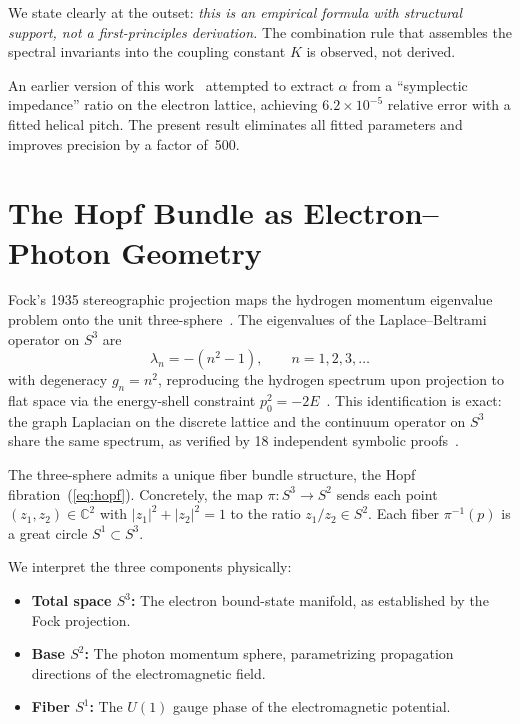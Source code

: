 \documentclass[aps,prl,twocolumn,superscriptaddress]{revtex4-2}
\begin{document}
We state clearly at the outset: \textit{this is an empirical formula
with structural support, not a first-principles derivation.} The
combination rule that assembles the spectral invariants into the
coupling constant $K$ is observed, not derived.

An earlier version of this work~\cite{paper2_old} attempted to extract
$\alpha$ from a ``symplectic impedance'' ratio on the electron
lattice, achieving $6.2 \times 10^{-5}$ relative error with a fitted
helical pitch. The present result eliminates all fitted parameters and
improves precision by a factor of~500.


\section{The Hopf Bundle as Electron--Photon Geometry}

Fock's 1935 stereographic projection maps the hydrogen momentum
eigenvalue problem onto the unit three-sphere~\cite{fock1935}. The
eigenvalues of the Laplace--Beltrami operator on $S^3$ are
\begin{equation}\label{eq:s3eig}
  \lambda_n = -(n^2 - 1), \qquad n = 1, 2, 3, \ldots
\end{equation}
with degeneracy $g_n = n^2$, reproducing the hydrogen spectrum upon
projection to flat space via the energy-shell constraint
$p_0^2 = -2E$~\cite{paper7}. This identification is exact: the graph
Laplacian on the discrete lattice and the continuum operator on $S^3$
share the same spectrum, as verified by 18 independent symbolic
proofs~\cite{paper7}.

The three-sphere admits a unique fiber bundle structure, the Hopf
fibration~(\ref{eq:hopf}). Concretely, the map
$\pi: S^3 \to S^2$ sends each point $(z_1, z_2) \in \mathbb{C}^2$
with $|z_1|^2 + |z_2|^2 = 1$ to the ratio $z_1/z_2 \in S^2$. Each
fiber $\pi^{-1}(p)$ is a great circle $S^1 \subset S^3$.

We interpret the three components physically:
\begin{itemize}
\item \textbf{Total space $S^3$:} The electron bound-state manifold,
  as established by the Fock projection.
\item \textbf{Base $S^2$:} The photon momentum sphere, parametrizing
  propagation directions of the electromagnetic field.
\item \textbf{Fiber $S^1$:} The $U(1)$ gauge phase of the
  electromagnetic potential.
\end{itemize}
\end{document}
